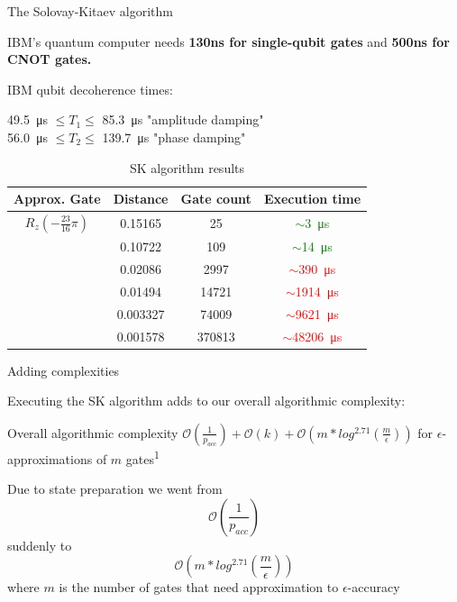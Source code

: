 \documentclass[10pt]{beamer}
\begin{document}
{
\begin{frame}{The Solovay-Kitaev algorithm}

IBM's quantum computer needs \textbf{130ns for single-qubit gates} and \textbf{500ns for CNOT gates.}

IBM qubit decoherence times:

\SI{49.5}{\micro\second} $\leq T_1 \leq$ \SI{85.3}{\micro\second} "amplitude damping"\\
\SI{56.0}{\micro\second} $\leq T_2 \leq$ \SI{139.7}{\micro\second} "phase damping"
\vspace{6mm}


\begin{table}
    \begin{tabular}{c| c |c |c }
      \toprule
      Approx. Gate & Distance & Gate count & Execution time\\
      \midrule
      $R_z(-\frac{23}{16}\pi)$ & 0.15165 & 25 & \textcolor{green}{$\sim$\SI{3}{\micro\second}}\\
       & 0.10722 & 109 & \textcolor{green}{$\sim$\SI{14}{\micro\second}}\\
       & 0.02086 & 2997 & \textcolor{red}{$\sim$\SI{390}{\micro\second}}\\
       & 0.01494 & 14721 & \textcolor{red}{$\sim$\SI{1914}{\micro\second}}\\
       & 0.003327 & 74009 & \textcolor{red}{$\sim$\SI{9621}{\micro\second}}\\
       & 0.001578 & 370813 & \textcolor{red}{$\sim$\SI{48206}{\micro\second}}\\
      \bottomrule
    \end{tabular}
    \caption{SK algorithm results}
  \end{table}
 

\end{frame}
}

{
\begin{frame}{Adding complexities}

Executing the SK algorithm adds to our overall algorithmic complexity:

	\begin{alertblock}{Overall algorithmic complexity}
	$\mathcal{O}(\frac{1}{p_{acc}})+\mathcal{O}(k)+\mathcal{O}(m*log^{2.71}(\frac{m}{\epsilon}))$ for $\epsilon$-approximations of $m$ gates\textsuperscript{1}
	\end{alertblock}
	
Due to state preparation we went from
\begin{equation}
\mathcal{O}(\frac{1}{p_{acc}})
\end{equation}
suddenly to 
\begin{equation}
\mathcal{O}(m*log^{2.71}(\frac{m}{\epsilon}))
\end{equation}
where $m$ is the number of gates that need approximation to $\epsilon$-accuracy

\end{frame}
}
\end{document}
